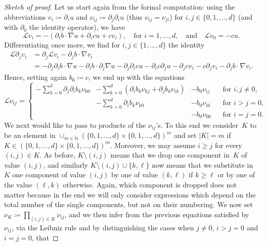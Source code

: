 \documentclass[a4paper,10pt]{article}
\newcommand\1{\mathbbm{1}}
\numberwithin{equation}{section}
\begin{document}
\begin{proof}[Sketch of proof]
Let us start again from the formal computation: using the abbreviations $v_{i}\coloneqq \partial_{i}u$ and $\nu_{ij}\coloneqq  \partial_j \partial_{i} u$ (thus $\nu_{ij} = \nu_{ji}$) for $i,j \in \{0,1,\ldots,d\}$ (and with $\partial_0$ the identity operator), we have 
\begin{equation*}
\mathcal{L}v_{i}=-(\partial_{i}b\cdot\nabla u+ \partial_{i}
c u +cv_{i})  ,\quad \text{for } i=1,\ldots,d, \quad \text{and} \quad \mathcal{L}v_{0}=-c u  .
\end{equation*}
Differentiating once more, we find for $i,j \in \{1,\ldots,d\}$ the identity 
\begin{align*}
\mathcal{L} \partial_{j} v_{i} & =  \partial_{j} \mathcal{L} v_{i} - \partial_{j} b \cdot \nabla v_{i} \\
  & = -  \partial_{j} \partial_{i}b\cdot\nabla u - \partial_{i}b\cdot \partial_{j} \nabla u 
  - \partial_{j} \partial_{i} c u -  \partial_{i} c \partial_{j} u  - \partial_{j}c v_{i} 
  - c \partial_{j} v_{i} - \partial_{j} b \cdot \nabla v_{i} .
\end{align*}
Hence, setting again $b_0 \coloneqq  c$, we end up with the equations 
\begin{equation*}
  \mathcal{L} \nu_{ij} =  \left\{ \begin{array}{llll} \displaystyle - \sum_{k=0}^{d} \partial_{j} \partial_{i}b_k \nu_{k0} & \displaystyle - \sum_{k=0}^{d} ( \partial_{i} b_k \nu_{kj} + \partial_j b_k \nu_{ik})  & - b_0 \nu_{ij} \quad & \text{for } i,j \neq 0 , \\
   & \displaystyle - \sum_{k=0}^{d} \partial_{i} b_k \nu_{k0} & - b_0 \nu_{i0} & \text{for } i>j=0 , \\[0.6cm]
  & & - b_0 \nu_{00} & \text{for } i=j=0 .
  \end{array} \right.
\end{equation*}
We next would like to pass to products of the $\nu_{ij}$'s. To this end we consider~$K$ to be an element in $\cup_{m \in \mathbb{N}} ( \{0,1,\ldots,d\} \times  \{0,1,\ldots,d\} )^m$ and set $|K| = m$ if $K \in ( \{0,1,\ldots,d\} \times  \{0,1,\ldots,d\} )^m$. Moreover, we may assume $i \geq j$ for every $(i,j) \in K$. As before, $K \setminus (i,j)$ means that we drop one component in~$K$ of value $(i,j)$, and similarly $K \setminus (i,j) \cup \{k,\ell\}$ now means that we substitute in~$K$ one component of value $(i,j)$ by one of value $(k,\ell)$ if $k \geq \ell$ or by one of the value $(\ell,k)$ otherwise. Again, which component is dropped does not matter because in the end we will only consider expressions which depend on the total number of the single components, but not on their numbering. We now set $\nu_K \coloneqq  \prod_{(i,j) \in K} \nu_{ij}$, and we then infer from the previous equations satisfied by $\nu_{ij}$, via the Leibniz rule and by distinguishing the cases when $j \neq 0$, $i>j=0$ and $i=j=0$, that

\end{proof}
\end{document}
